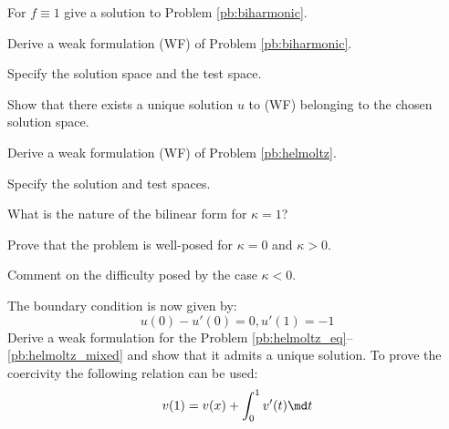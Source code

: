 \begin{tmasltn}{1.3}
\begin{tmatsks}
\item For $f \equiv 1$ give a solution to Problem \eqref{pb:biharmonic}.
\item Derive a weak formulation (WF) of Problem \eqref{pb:biharmonic}.
\item Specify the solution space and the test space.
\item Show that there exists a unique solution $u$ to (WF) belonging to the chosen solution space.
\end{tmatsks}
\end{tmasltn}


\begin{tmasltn}{1.4}
\begin{tmatsks}
\item Derive a weak formulation (WF) of Problem \eqref{pb:helmoltz}.
\item Specify the solution and test spaces.
\item What is the nature of the bilinear form for $\kappa = 1$?
\item Prove that the problem is well-posed for $\kappa = 0$ and $\kappa > 0$.
\item Comment on the difficulty posed by the case $\kappa < 0$.
\item The boundary condition is now given by:
\begin{equation}
 u(0) - u'(0) = 0, u'(1) = -1
\end{equation}
Derive a weak formulation for the Problem \eqref{pb:helmoltz_eq}--\eqref{pb:helmoltz_mixed} and show that it admits a unique solution.
To prove the coercivity the following relation can be used:
\[
v(1) = v(x) + \int_0^1 v'(t) \md t
\]
\end{tmatsks}
\end{tmasltn}

